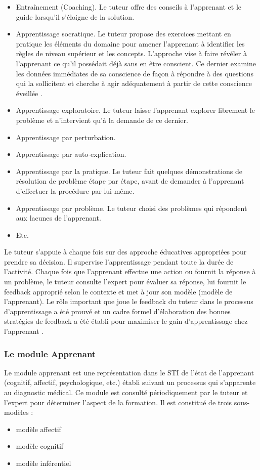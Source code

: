 \begin{itemize}
    \item Entraînement (Coaching). Le tuteur offre des conseils à l'apprenant et le guide lorsqu'il s'éloigne de la solution.
    \item Apprentissage socratique. Le tuteur propose des exercices mettant en pratique les éléments du domaine pour amener l'apprenant à identifier les règles
de niveau supérieur et les concepts. L'approche vise à faire révéler à l'apprenant ce qu'il possédait déjà sans en être conscient. Ce dernier examine les données immédiates de sa conscience de façon à répondre à des questions
qui la sollicitent et cherche à agir adéquatement à partir de cette conscience
éveillée .
    \item Apprentissage exploratoire. Le tuteur laisse l'apprenant explorer librement
le problème et n'intervient qu'à la demande de ce dernier.
    \item Apprentissage par perturbation.
    \item Apprentissage par auto-explication.
    \item Apprentissage par la pratique. Le tuteur fait quelques démonstrations de
résolution de problème étape par étape, avant de demander à l'apprenant d'effectuer la procédure par lui-même.
    \item Apprentissage par problème. Le tuteur choisi des problèmes qui répondent aux lacunes de l'apprenant.
    \item Etc.
\end{itemize}

Le tuteur s'appuie à chaque fois sur des approche éducatives appropriées pour prendre sa décision. Il supervise l'apprentissage pendant toute la durée de l'activité. Chaque fois que l'apprenant effectue une action ou fournit la réponse à un problème, le tuteur consulte l'expert pour évaluer sa réponse, lui fournit le
feedback approprié selon le contexte et met à jour son modèle (modèle de l'apprenant). Le rôle important que joue le feedback du tuteur dans le processus d'apprentissage a été prouvé et un cadre formel d'élaboration des bonnes stratégies de feedback \cite{narciss2008feedback} a été établi pour maximiser le gain d'apprentissage chez l'apprenant .


\subsubsection{Le module Apprenant}
Le module apprenant est une représentation dans le STI de l'état de l'apprenant (cognitif, affectif, psychologique, etc.) établi suivant un processus qui
s'apparente au diagnostic médical. Ce module est consulté périodiquement par le
tuteur et l'expert pour déterminer l'aspect de la formation.
 Il est constitué de trois sous-modèles :
 \begin{itemize}
     \item modèle affectif
    \item modèle cognitif
    \item modèle inférentiel 
\end{itemize}

